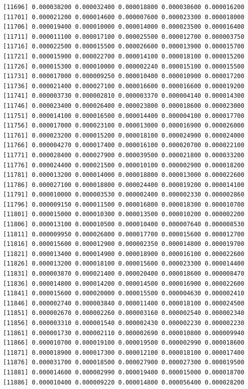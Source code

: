 \documentclass[]{article}
\begin{document}
\begin{verbatim}
[11696] 0.000038200 0.000032400 0.000018800 0.000038600 0.000016200
[11701] 0.000021200 0.000014600 0.000007600 0.000023300 0.000018000
[11706] 0.000019400 0.000010000 0.000014000 0.000023500 0.000016400
[11711] 0.000011100 0.000017100 0.000025500 0.000012700 0.000003750
[11716] 0.000022500 0.000015500 0.000026600 0.000013900 0.000015700
[11721] 0.000015900 0.000022700 0.000014100 0.000018100 0.000015200
[11726] 0.000015300 0.000010000 0.000002240 0.000015100 0.000015500
[11731] 0.000017000 0.000009250 0.000010400 0.000010900 0.000017200
[11736] 0.000021400 0.000027100 0.000016600 0.000016600 0.000019200
[11741] 0.000003730 0.000002810 0.000003370 0.000004140 0.000014300
[11746] 0.000023400 0.000026400 0.000023800 0.000018600 0.000023000
[11751] 0.000014100 0.000016500 0.000014400 0.000004100 0.000017700
[11756] 0.000017000 0.000023100 0.000013000 0.000016900 0.000026000
[11761] 0.000023200 0.000015200 0.000018100 0.000024900 0.000024000
[11766] 0.000004270 0.000017400 0.000016100 0.000020700 0.000022100
[11771] 0.000028400 0.000027900 0.000039500 0.000021800 0.000033200
[11776] 0.000024400 0.000021500 0.000010100 0.000002900 0.000018200
[11781] 0.000013200 0.000014000 0.000018800 0.000013000 0.000022600
[11786] 0.000027100 0.000018800 0.000024400 0.000019200 0.000014100
[11791] 0.000010000 0.000003530 0.000002400 0.000002330 0.000002860
[11796] 0.000009150 0.000011500 0.000016800 0.000018300 0.000010700
[11801] 0.000015000 0.000010300 0.000013500 0.000010200 0.000002200
[11806] 0.000013100 0.000010500 0.000010400 0.000007640 0.000008530
[11811] 0.000009950 0.000026800 0.000017700 0.000015600 0.000012700
[11816] 0.000015600 0.000012900 0.000002350 0.000014800 0.000019700
[11821] 0.000013400 0.000014900 0.000018900 0.000016100 0.000022600
[11826] 0.000013200 0.000018100 0.000015600 0.000023300 0.000014400
[11831] 0.000003870 0.000021400 0.000020400 0.000018600 0.000008470
[11836] 0.000014800 0.000014200 0.000014500 0.000016900 0.000022600
[11841] 0.000015600 0.000020000 0.000015500 0.000004630 0.000002410
[11846] 0.000002740 0.000003840 0.000011400 0.000018100 0.000024500
[11851] 0.000002670 0.000002260 0.000003160 0.000002540 0.000002340
[11856] 0.000003310 0.000001540 0.000002430 0.000002230 0.000002230
[11861] 0.000001730 0.000002110 0.000002690 0.000010800 0.000009940
[11866] 0.000010700 0.000019100 0.000019500 0.000002990 0.000018600
[11871] 0.000018900 0.000017300 0.000012100 0.000018100 0.000017400
[11876] 0.000031700 0.000018500 0.000027900 0.000027300 0.000019500
[11881] 0.000014600 0.000002990 0.000019400 0.000015000 0.000018700
[11886] 0.000010400 0.000009220 0.000014800 0.000056400 0.000028200

\end{verbatim}
\end{document}
